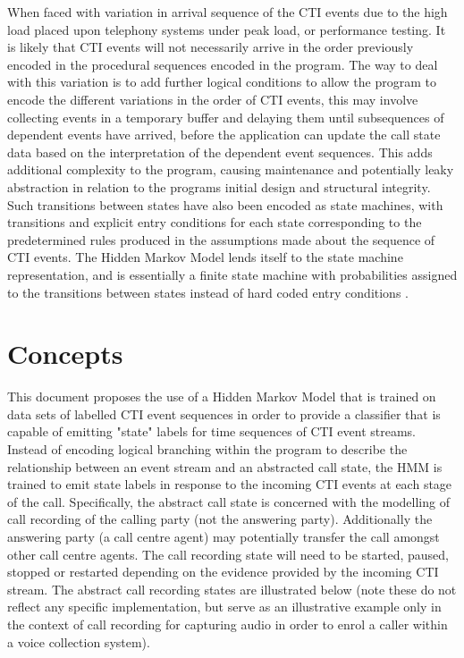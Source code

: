 \documentclass[11pt]{article}
\begin{document}
When faced with variation in arrival sequence of the CTI events due to the high load placed upon telephony systems under peak load, or performance testing. It is likely that CTI events will not necessarily arrive in the order previously encoded in the procedural sequences encoded in the program. The way to deal with this variation is to add further logical conditions to allow the program to encode the different variations in the order of CTI events, this may involve collecting events in a temporary buffer and delaying them until subsequences of dependent events have arrived, before the application can update the call state data based on the interpretation of the dependent event sequences. This adds additional complexity to the program, causing maintenance and potentially leaky abstraction in relation to the programs initial design and structural integrity.\\
Such transitions between states have also been encoded as state machines, with transitions and explicit entry conditions for each state corresponding to the predetermined rules produced in the assumptions made about the sequence of CTI events. The Hidden Markov Model lends itself to the state machine representation, and is essentially a finite state machine with probabilities assigned to the transitions between states instead of hard coded entry conditions \cite{pc}. 

\section{Concepts}

This document proposes the use of a Hidden Markov Model that is trained on data sets of labelled CTI event sequences in order to provide a classifier that is capable of emitting "state" labels for time sequences of CTI event streams. Instead of encoding logical branching within the program to describe the relationship between an event stream and an abstracted call state, the HMM is trained to emit state labels in response to the incoming CTI events at each stage of the call. Specifically, the abstract call state is concerned with the modelling of call recording of the calling party (not the answering party). Additionally the answering party (a call centre agent) may potentially transfer the call amongst other call centre agents. The call recording state will need to be started, paused, stopped or restarted depending on the evidence provided by the incoming CTI stream. The abstract call recording states are illustrated below (note these do not reflect any specific implementation, but serve as an illustrative example only in the context of call recording for capturing audio in order to enrol a caller within a voice collection system). \\
\end{document}
